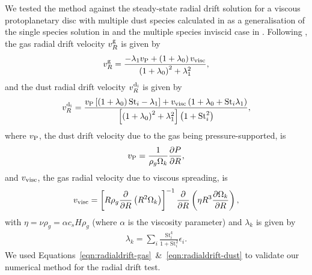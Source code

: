 \documentclass[fleqn,usenatbib]{mnras}
\begin{document}
We tested the method against the steady-state radial drift solution for a
viscous protoplanetary disc with multiple dust species calculated in
\citet{Dipierro2018MNRAS.479.4187D} as a generalisation of the single species
solution in \citet{Nakagawa1986Icar...67..375N} and the multiple species
inviscid case in \citet{Bai2010ApJ...722.1437B}. Following
\citet{Dipierro2018MNRAS.479.4187D}, the gas radial drift velocity \(v^{\rm
g}_R\) is given by
%
\begin{align}
   \label{eqn:radialdrift-gas}
   v^{\rm g}_R = \frac{-\lambda_1 v_{\rm P} + \left(1 + \lambda_0\right) v_{\rm visc}}
      {\left(1 + \lambda_0\right)^2 + \lambda_1^2},
\end{align}
%
and the dust radial drift velocity \(v^{\rm d_i}_R\) is given by
%
\begin{align}
   \label{eqn:radialdrift-dust}
   v^{\rm d_i}_R = \frac{v_{\rm P} \left[\left(1 + \lambda_0\right) \mathrm{St}_i - \lambda_1\right]
      + v_{\rm visc} \left(1 + \lambda_0 + \mathrm{St}_i \lambda_1\right)}
      {\left[\left(1 + \lambda_0\right)^2 + \lambda_1^2\right] \left(1 + \mathrm{St}_i^2\right)},
\end{align}
%
where \(v_{\rm P}\), the dust drift velocity due to the gas being
pressure-supported, is
%
\begin{align}
   \label{eqn:radialdrift-pressure}
   v_{\rm P} = \frac{1}{\rho_g \Omega_k} \frac{\partial P}{\partial R},
\end{align}
%
and \(v_{\rm visc}\), the gas radial velocity due to viscous spreading, is
\begin{align}
   \label{eqn:radialdrift-visc}
   v_{\rm visc} = \left[R \rho_g \frac{\partial}{\partial R} \left(R^2 \Omega_k\right) \right]^{-1}
      \frac{\partial}{\partial R} \left( \eta R^3 \frac{\partial \Omega_k}{\partial R} \right),
\end{align}
%
with \(\eta = \nu \rho_g = \alpha c_s H \rho_g\) (where \(\alpha\) is the
\citet{Shakura1973A&A....24..337S} viscosity parameter) and \(\lambda_k\) is
given by
%
\begin{align}
   \label{eqn:radialdrift-lambda}
   \lambda_k = \sum_i \frac{\mathrm{St}^k_i}{1 + \mathrm{St}_i^2} \epsilon_i.
\end{align}
%
We used Equations~\ref{eqn:radialdrift-gas}~\&~\ref{eqn:radialdrift-dust} to
validate our numerical method for the radial drift test.
\end{document}
